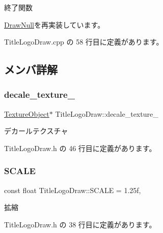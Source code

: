 終了関数 



\mbox{\hyperlink{class_draw_null_a12d44e341c7364b5ab9cdd661dc16187}{Draw\+Null}}を再実装しています。



 Title\+Logo\+Draw.\+cpp の 58 行目に定義があります。



\subsection{メンバ詳解}
\mbox{\label{class_title_logo_draw_a84be55e143853754d0b5f21647e3c595}} 
\subsubsection{\texorpdfstring{decale\+\_\+texture\+\_\+}{decale\_texture\_}}
{\footnotesize\ttfamily \mbox{\hyperlink{class_texture_object}{Texture\+Object}}$\ast$ Title\+Logo\+Draw\+::decale\+\_\+texture\+\_\+\hspace{0.3cm}{\ttfamily [private]}}



デカールテクスチャ 



 Title\+Logo\+Draw.\+h の 46 行目に定義があります。

\mbox{\label{class_title_logo_draw_a22181b94dc000a9fb9f68a21af9523ab}} 
\subsubsection{\texorpdfstring{S\+C\+A\+LE}{SCALE}}
{\footnotesize\ttfamily const float Title\+Logo\+Draw\+::\+S\+C\+A\+LE = 1.\+25f\hspace{0.3cm}{\ttfamily [static]}, {\ttfamily [private]}}



拡縮 



 Title\+Logo\+Draw.\+h の 38 行目に定義があります。

